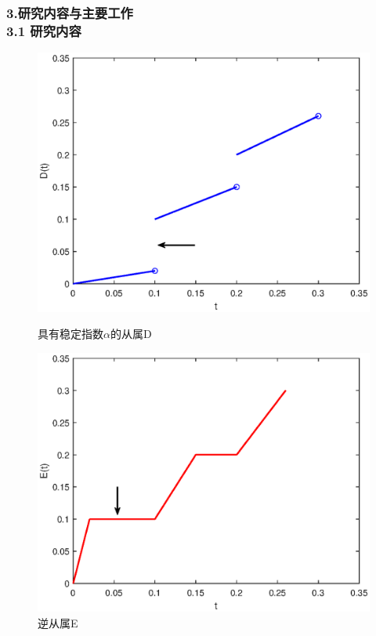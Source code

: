 \documentclass[notheorems,10pt,compress]{beamer}
\numberwithin{figure}{section}
\numberwithin{table}{section}
\numberwithin{equation}{section}
\numberwithin{theorem}{section}
\numberwithin{definition}{section}
\numberwithin{lemma}{section}
\numberwithin{proposition}{section}
\numberwithin{corollary}{section}
\theoremstyle{example}
\begin{document}
	\begin{frame}
		\frametitle{3.研究内容与主要工作\\ 3.1 研究内容}
		\begin{figure}[!htp]
			\begin{minipage}[h]{0.48\linewidth}
				\centering
				\includegraphics[width=0.9\linewidth]{D的概念图.eps}
				\caption{具有稳定指数$\alpha$的从属D}
				\label{CIRrate}
			\end{minipage}
			\begin{minipage}[h]{0.48\linewidth}
				\centering
				\includegraphics[width=0.9\linewidth]{E的概念图.eps}%
				\caption{逆从属E}
				\label{CEVrate}
			\end{minipage}
		\end{figure}
	\end{frame}
	
\end{document}
